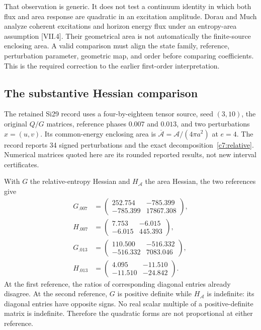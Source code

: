 That observation is generic. It does not test a continuum identity in which both flux and area response are quadratic in an excitation amplitude. Dorau and Much analyze coherent excitations and horizon energy flux under an entropy-area assumption [VII.4]. Their geometrical area is not automatically the finite-source enclosing area. A valid comparison must align the state family, reference, perturbation parameter, geometric map, and order before comparing coefficients. This is the required correction to the earlier first-order interpretation.

\subsection{The substantive Hessian comparison}
The retained Si29 record uses a four-by-eighteen tensor source, seed $(3,10)$, the original $Q/G$ matrices, reference phases $0.007$ and $0.013$, and two perturbations $x=(u,v)$. Its common-energy enclosing area is $\overline{\mathcal A}=\mathcal A/(4\pi a^2)$ at $e=4$. The record reports 34 signed perturbations and the exact decomposition~\eqref{c7:relative}. Numerical matrices quoted here are its rounded reported results, not new interval certificates.

With $G$ the relative-entropy Hessian and $H_{\mathcal A}$ the area Hessian, the two references give
\begin{align}
 G_{.007}&=\begin{pmatrix}252.754&-785.399\\-785.399&17867.308\end{pmatrix},\\
 H_{.007}&=\begin{pmatrix}7.753&-6.015\\-6.015&445.393\end{pmatrix},\label{c7:hess1}\\
 G_{.013}&=\begin{pmatrix}110.500&-516.332\\-516.332&7083.046\end{pmatrix},\\
 H_{.013}&=\begin{pmatrix}4.095&-11.510\\-11.510&-24.842\end{pmatrix}.
 \label{c7:hess2}
\end{align}
At the first reference, the ratios of corresponding diagonal entries already disagree. At the second reference, $G$ is positive definite while $H_{\mathcal A}$ is indefinite: its diagonal entries have opposite signs. No real scalar multiple of a positive-definite matrix is indefinite. Therefore the quadratic forms are not proportional at either reference.


